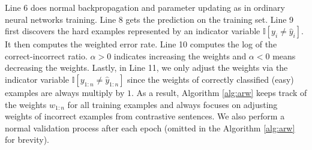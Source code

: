Line 6 does normal backpropagation and parameter updating as in ordinary neural networks training.
Line 8 gets the prediction on the training set.
Line 9 first discovers the hard examples represented by an indicator variable $\mathbb{I}[y_{i}\neq \hat{y}_{i}] $.
It then computes the weighted error rate. 
Line 10 computes the log of the correct-incorrect ratio. $\alpha >0$ indicates increasing the weights and $\alpha<0$ means decreasing the weights.
Lastly, in Line 11, we only adjust the weights via the indicator variable $\mathbb{I}[y_{1:n} \neq \hat{y}_{1:n}]$ since the weights of correctly classified (easy) examples are always multiply by $1$.
As a result, Algorithm \ref{alg:arw} keeps track of the weights $w_{1:n}$ for all training examples and always focuses on adjusting weights of incorrect examples from contrastive sentences. We also perform a normal validation process after each epoch (omitted in the Algorithm \ref{alg:arw} for brevity).




